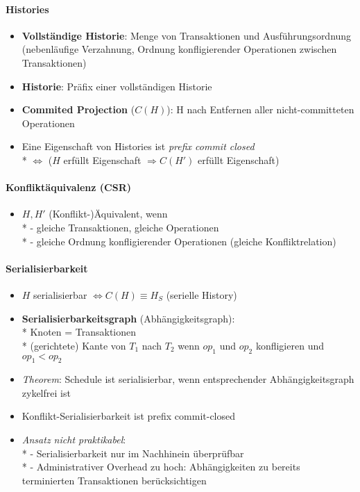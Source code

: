 \paragraph{Histories}
\begin{itemize}
	\item \textbf{Vollständige Historie}: Menge von Transaktionen und Ausführungsordnung (nebenläufige Verzahnung, Ordnung konfligierender Operationen zwischen Transaktionen)
	\item \textbf{Historie}: Präfix einer vollständigen Historie
	\item \textbf{Commited Projection} (\( C(H) \)): H nach Entfernen aller nicht-committeten Operationen
	\item Eine Eigenschaft von Histories ist \emph{prefix commit closed}
		\\*
		\( \Leftrightarrow \) (\( H \) erfüllt Eigenschaft \( \Rightarrow C(H') \) erfüllt Eigenschaft)
\end{itemize}

\paragraph{Konfliktäquivalenz (CSR)}
\begin{itemize}
	\item \( H, H' \) (Konflikt-)Äquivalent, wenn \\*
		- gleiche Transaktionen, gleiche Operationen \\*
		- gleiche Ordnung konfligierender Operationen (gleiche Konfliktrelation)
\end{itemize}

\paragraph{Serialisierbarkeit}
\begin{itemize}
	\item \( H \) serialisierbar \( \Leftrightarrow C(H) \equiv H_S \) (serielle History)
	\item \textbf{Serialisierbarkeitsgraph} (Abhängigkeitsgraph):
		\\*
		Knoten = Transaktionen
		\\*
		(gerichtete) Kante von $T_1$ nach $T_2$ wenn $op_1$ und $op_2$ konfligieren und $op_1 < op_2$
	\item \emph{Theorem}: Schedule ist serialisierbar, wenn entsprechender Abhängigkeitsgraph zykelfrei ist
	\item Konflikt-Serialisierbarkeit ist prefix commit-closed
	\item \emph{Ansatz nicht praktikabel}: \\*
		- Serialisierbarkeit nur im Nachhinein überprüfbar \\*
		- Administrativer Overhead zu hoch: Abhängigkeiten zu bereits terminierten Transaktionen berücksichtigen
\end{itemize}

